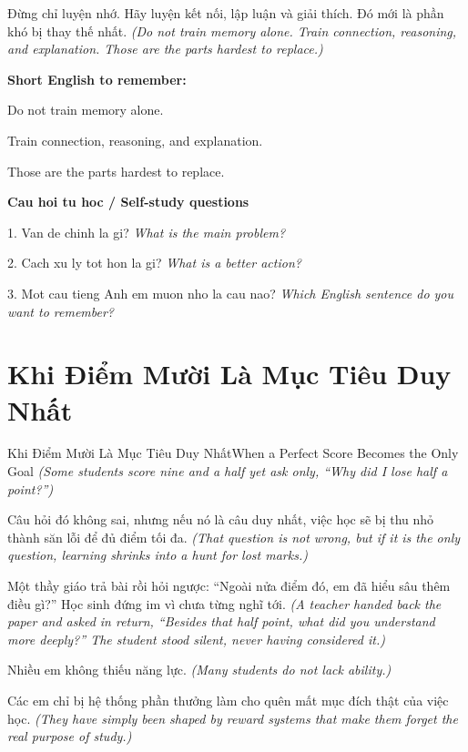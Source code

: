 \begin{baihoc}
Đừng chỉ luyện nhớ. Hãy luyện kết nối, lập luận và giải thích. Đó mới là phần khó bị thay thế nhất.
\textit{(Do not train memory alone. Train connection, reasoning, and explanation. Those are the parts hardest to replace.)}
\end{baihoc}

\begin{ghinhoanh}
\textbf{Short English to remember:}

Do not train memory alone.

Train connection, reasoning, and explanation.

Those are the parts hardest to replace.

\end{ghinhoanh}

\begin{tuhocnhanh}
\textbf{Cau hoi tu hoc / Self-study questions}

1. Van de chinh la gi? \textit{What is the main problem?}

2. Cach xu ly tot hon la gi? \textit{What is a better action?}

3. Mot cau tieng Anh em muon nho la cau nao? \textit{Which English sentence do you want to remember?}
\end{tuhocnhanh}
\ngancach

\section{Khi Điểm Mười Là Mục Tiêu Duy Nhất}
\begin{truyen}{Khi Điểm Mười Là Mục Tiêu Duy Nhất}{When a Perfect Score Becomes the Only Goal}
\textit{(Some students score nine and a half yet ask only, ``Why did I lose half a point?'')}

Câu hỏi đó không sai, nhưng nếu nó là câu duy nhất, việc học sẽ bị thu nhỏ thành săn lỗi để đủ điểm tối đa.
\textit{(That question is not wrong, but if it is the only question, learning shrinks into a hunt for lost marks.)}

Một thầy giáo trả bài rồi hỏi ngược: ``Ngoài nửa điểm đó, em đã hiểu sâu thêm điều gì?'' Học sinh đứng im vì chưa từng nghĩ tới.
\textit{(A teacher handed back the paper and asked in return, ``Besides that half point, what did you understand more deeply?'' The student stood silent, never having considered it.)}

Nhiều em không thiếu năng lực.
\textit{(Many students do not lack ability.)}

Các em chỉ bị hệ thống phần thưởng làm cho quên mất mục đích thật của việc học.
\textit{(They have simply been shaped by reward systems that make them forget the real purpose of study.)}

\end{truyen}

